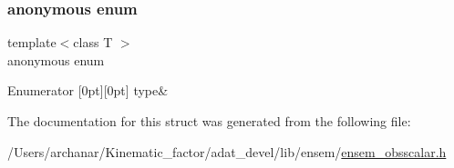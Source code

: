 \subsubsection{\texorpdfstring{anonymous enum}{anonymous enum}}
{\footnotesize\ttfamily template$<$class T $>$ \\
anonymous enum}

\begin{DoxyEnumFields}{Enumerator}
[0pt][0pt]{}\mbox{\label{structENSEM_1_1EnsbcIO_3_01OScalar_3_01T_01_4_01_4_acede6091c60bccec029cd25516a67258a1225eb40e728dd20bf5cc62fdb91e6ad}} 
type&\\
\hline

\end{DoxyEnumFields}


The documentation for this struct was generated from the following file\+:\begin{DoxyCompactItemize}
\item 
/\+Users/archanar/\+Kinematic\+\_\+factor/adat\+\_\+devel/lib/ensem/\mbox{\hyperlink{lib_2ensem_2ensem__obsscalar_8h}{ensem\+\_\+obsscalar.\+h}}\end{DoxyCompactItemize}
